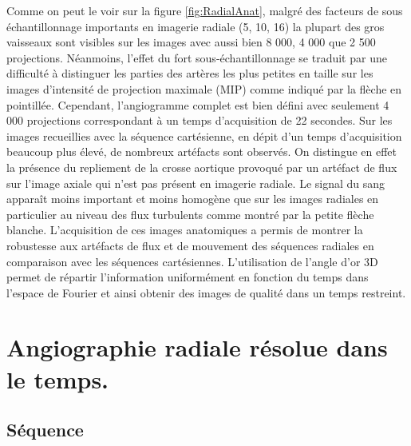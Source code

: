 Comme on peut le voir sur la figure \ref{fig:RadialAnat}, malgré des facteurs de sous échantillonnage importants en imagerie radiale (5, 10, 16) la plupart des gros vaisseaux sont visibles sur les images avec aussi bien 8 000, 4 000 que 2 500 projections. Néanmoins, l’effet du fort sous-échantillonnage se traduit par une difficulté à distinguer les parties des artères les plus petites en taille sur les images d’intensité de projection maximale (MIP) comme indiqué par la flèche en pointillée. Cependant, l’angiogramme complet est bien défini avec seulement 4 000 projections correspondant à un temps d’acquisition de 22 secondes. 
Sur les images recueillies avec la séquence cartésienne, en dépit d’un temps d’acquisition beaucoup plus élevé, de nombreux artéfacts sont observés. On distingue en effet la présence du repliement de la crosse aortique provoqué par un artéfact de flux sur l’image axiale qui n’est pas présent en imagerie radiale. Le signal du sang apparaît moins important et moins homogène que sur les images radiales en particulier au niveau des flux turbulents comme montré par la petite flèche blanche.
L’acquisition de ces images anatomiques a permis de montrer la robustesse aux artéfacts de flux et de mouvement des séquences radiales en comparaison avec les séquences cartésiennes.  
L’utilisation de l’angle d’or 3D permet de répartir l’information uniformément en fonction du temps dans l’espace de Fourier et ainsi obtenir des images de qualité dans un temps restreint.

\section{Angiographie radiale résolue dans le temps.}

\subsection{Séquence}

